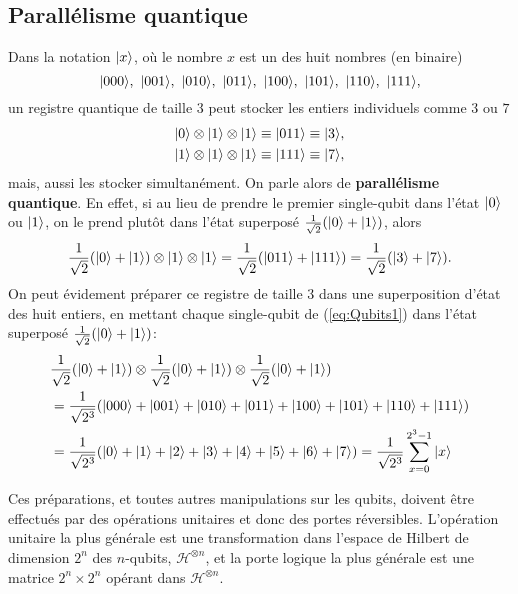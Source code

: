 \subsection{Parallélisme quantique}

Dans la notation $\vert x\rangle$, où le nombre $x$ est un des huit
nombres (en binaire)%
\begin{equation}
\vert000\rangle,\ \vert001\rangle,\ \vert010\rangle,\ \vert011\rangle,\ \vert100\rangle,\ \vert101\rangle ,\
\vert110\rangle ,\ \vert111\rangle ,
\end{equation}
un registre quantique de taille $3$ peut stocker les entiers individuels comme
$3$ ou $7$%
\begin{subequations}%
\label{eq:Qubits1}%
\begin{align}
\vert0\rangle \otimes\vert1\rangle \otimes\vert1\rangle  & \equiv\vert011\rangle\equiv\vert3\rangle ,\\
\vert1\rangle \otimes\vert1\rangle \otimes\vert1\rangle  & \equiv\vert111\rangle \equiv\vert7\rangle ,
\end{align}%
\end{subequations}%
mais, aussi les stocker simultanément. On parle alors de \textbf{parallélisme
quantique}. En effet, si au lieu de prendre le premier single-qubit dans l'état
$\vert0\rangle $ ou $\vert1\rangle $, on le prend plutôt dans l'état superposé
$\frac{1}{\sqrt{2}}(\vert0\rangle+\vert1\rangle)$, alors%
\begin{equation}
\frac{1}{\sqrt{2}}(\vert0\rangle +\vert1\rangle)\otimes\vert1\rangle \otimes\vert1\rangle =\frac
{1}{\sqrt{2}}(\vert011\rangle+\vert111\rangle)=\frac{1}{\sqrt{2}}(\vert3\rangle +\vert7\rangle ).
\end{equation}
On peut évidement préparer ce registre de taille $3$ dans une superposition
d'état des huit entiers, en mettant chaque single-qubit de (\ref{eq:Qubits1})
dans l'état superposé $\frac{1}{\sqrt{2}}(\vert0\rangle +\vert1\rangle)$:%
\begin{equation}
\begin{split}
&\frac{1}{\sqrt{2}}(\vert0\rangle+\vert1\rangle)\otimes\frac{1}{\sqrt{2}}(\vert0\rangle
+\vert1\rangle)\otimes\frac{1}{\sqrt{2}}(\vert0\rangle+\vert1\rangle )\\
&  =\frac{1}{\sqrt{2^{3}}}(\vert000\rangle+\vert001\rangle+\vert010\rangle+\vert011\rangle
+\vert100\rangle+\vert101\rangle +\vert110\rangle+\vert111\rangle)\\
&  =\frac{1}{\sqrt{2^{3}}}(\vert0\rangle +\vert1\rangle +\vert2\rangle +\vert3\rangle
+\vert4\rangle +\vert5\rangle +\vert6\rangle+\vert7\rangle)
=\frac{1}{\sqrt{2^{3}}}\sum_{x=0}^{2^{3}-1}\vert x\rangle
\end{split}
\end{equation}

Ces préparations, et toutes autres manipulations sur les qubits, doivent être
effectués par des opérations unitaires et donc des portes réversibles.
L'opération unitaire la plus générale est une transformation dans l'espace de
Hilbert de dimension $2^n$ des $n$-qubits, $\mathcal{H}^{\otimes n}$, et la
porte logique la plus générale est une matrice $2^n\times2^n$ opérant dans
$\mathcal{H}^{\otimes n}$.

